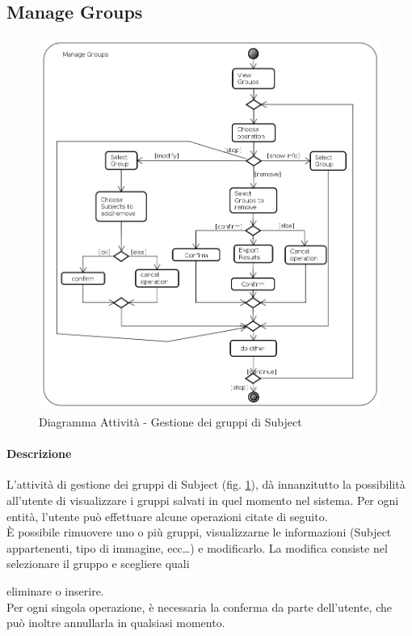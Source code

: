 \subsection{Manage Groups}
\label{ManageGr}
\begin{figure}[!h]
\centering
\includegraphics[width=\linewidth]{./Content/Immagini/Manage_Groups}
\caption{Diagramma Attività - Gestione dei gruppi di Subject}
\label{ManageG}
\end{figure}
\paragraph{Descrizione\\}
L'attività di gestione dei gruppi di Subject\glossario{} (fig. \ref{ManageG}), dà innanzitutto la possibilità all'utente di visualizzare i gruppi salvati in quel momento nel sistema. Per ogni entità, l'utente può effettuare alcune operazioni citate di seguito.\\
\`E possibile rimuovere uno o più gruppi, visualizzarne le informazioni (Subject\glossario{} appartenenti, tipo di immagine, ecc\dots) e modificarlo. La modifica consiste nel selezionare il gruppo e scegliere quali \subject{} eliminare o inserire.\\
Per ogni singola operazione, è necessaria la conferma da parte dell'utente, che può inoltre annullarla in qualsiasi momento.
\pagebreak

